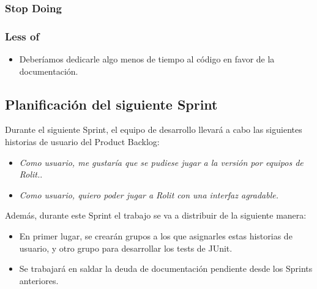 \documentclass[../../SCRUM.tex]{subfiles}
\begin{document}
\subsubsection*{Stop Doing}


\subsubsection*{Less of}
\begin{itemize}
\item Deberíamos dedicarle algo menos de tiempo al código en favor de la documentación.
\end{itemize}

\subsection{Planificación del siguiente Sprint}
Durante el siguiente Sprint, el equipo de desarrollo llevará a cabo las siguientes historias de usuario del Product Backlog:
\begin{itemize}
\item \textit{Como usuario, me gustaría que se pudiese jugar a la versión por equipos de Rolit.}.
\item \textit{Como usuario, quiero poder jugar a Rolit con una interfaz agradable.}

\end{itemize}
Además, durante este Sprint el trabajo se va a distribuir de la siguiente manera:
\begin{itemize}
\item En primer lugar, se crearán grupos a los que asignarles estas historias de usuario, y otro grupo para desarrollar los tests de JUnit.
\item Se trabajará en saldar la deuda de documentación pendiente desde los Sprints anteriores.

\end{itemize}
\end{document}
